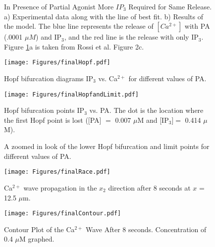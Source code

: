 \documentclass[preprint,12pt]{elsarticle}
\begin{document}
\begin{figure}[tbh]
\centering
{}
\caption{In Presence of Partial Agonist More $IP_3$ Required for Same Release. a) Experimental data along with the line of best fit. b) Results of the model. The blue line represents the release of $[Ca^{2+}]$ with PA (.0001 $\mu M$) and IP$_3$, and the red line is the release with only IP$_3$. Figure \ref{fig:Rossi3a}a is taken from Rossi et al. Figure 2c.}
\label{fig:Rossi3a}
\end{figure}

\begin{figure}[tbh]
\centering
\texttt{[image: Figures/finalHopf.pdf]}
\caption{Hopf bifurcation diagrams IP$_3$ vs. Ca$^{2+}$ for different values of PA.}
\label{fig:bif}
\end{figure}

\begin{figure}[tbh]
\centering
\texttt{[image: Figures/finalHopfandLimit.pdf]}
\caption{Hopf bifurcation points IP$_3$ vs. PA. The dot is the location where the first Hopf point is lost ([PA] $=$ 0.007 $\mu$M and [IP$_3$]$=$ 0.414 $\mu$M).}
\label{fig:2par}
\end{figure}

\begin{figure}[tbh]
\centering
{}
\caption{A zoomed in look of the lower Hopf bifurcation and limit points for different values of PA.}
\label{fig:Zoomed}
\end{figure}

\begin{figure}[tbh]
\centering
\texttt{[image: Figures/finalRace.pdf]}
\caption{Ca$^{2+}$ wave propagation in the $x_2$ direction after 8 seconds at $x$ = 12.5 $\mu$m.}
\label{fig:trace}
\end{figure}

\begin{figure}[tbh]
\centering
\texttt{[image: Figures/finalContour.pdf]}
\caption{Contour Plot of the Ca$^{2+}$ Wave After 8 seconds. Concentration of 0.4 $\mu$M graphed. }
\label{fig:contour}
\end{figure}
\end{document}
